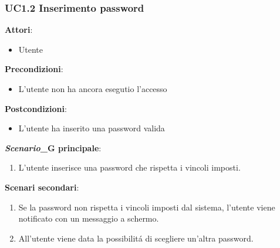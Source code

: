\subsubsection{UC1.2 Inserimento password}\label{usecase:1_2}
\textbf{Attori}:
\begin{itemize}
    \item Utente
\end{itemize}
\textbf{Precondizioni}:
\begin{itemize}
    \item L'utente non ha ancora esegutio l'accesso
\end{itemize}
\textbf{Postcondizioni}:
\begin{itemize}
    \item L'utente ha inserito una password valida
\end{itemize}
\textbf{\textit{Scenario}_G principale}:
\begin{enumerate}
    \item L'utente inserisce una password che rispetta i vincoli imposti.
\end{enumerate}
\textbf{Scenari secondari}:
\begin{enumerate}
    \item Se la password non rispetta i vincoli imposti dal sistema, l'utente viene notificato con un messaggio a schermo.
    \item All'utente viene data la possibilitá di scegliere un'altra password.
\end{enumerate}         